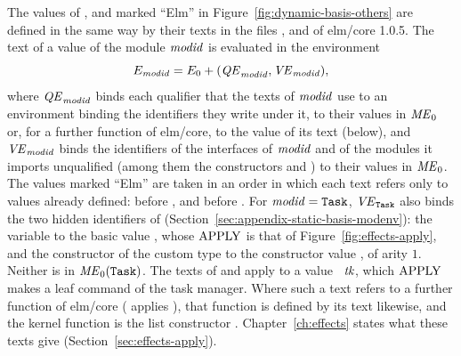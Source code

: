 The values of ,  and  marked
``Elm'' in Figure~\ref{fig:dynamic-basis-others} are defined in the same way
by their texts in the files ,
 and  of elm/core 1.0.5. The
text of a value of the module $\mathit{modid}$ is evaluated in the environment
\[
  E_{\mathit{modid}}=E_0+(\mathit{QE}_{\mathit{modid}},\mathit{VE}_{\mathit{modid}}),
\]
where $\mathit{QE}_{\mathit{modid}}$ binds each qualifier that the texts of $\mathit{modid}$ use to
an environment binding the identifiers they write under it, to their values
in $\mathit{ME}_0$ or, for a further function of elm/core, to the value of its text
(below), and $\mathit{VE}_{\mathit{modid}}$ binds the identifiers of the interfaces
of $\mathit{modid}$ and of the modules it imports unqualified (among them the
constructors  and ) to their values in $\mathit{ME}_0$. The values
marked ``Elm'' are taken in an order in which each text refers only to values
already defined:  before , and 
before . For $\mathit{modid}=\textnormal{\texttt{Task}}$, $\mathit{VE}_{\textnormal{\texttt{Task}}}$ also binds
the two hidden identifiers of 
(Section~\ref{sec:appendix-static-basis-modenv}): the variable 
to the basic value , whose $\mathrm{APPLY}$ is that of
Figure~\ref{fig:effects-apply}, and the constructor  of the
custom type  to the constructor value , of arity $1$.
Neither is in $\mathit{ME}_0(\textnormal{\texttt{Task}})$. The texts of  and
 apply  to a value ~$\mathit{tk}$, which
$\mathrm{APPLY}$ makes a leaf command of the task manager. %
Where such a text refers to a further function of elm/core
( applies ), that function is defined by its
text likewise, and the kernel function  is the list
constructor \kw{::}. Chapter~\ref{ch:effects} states what these texts give
(Section~\ref{sec:effects-apply}). %

